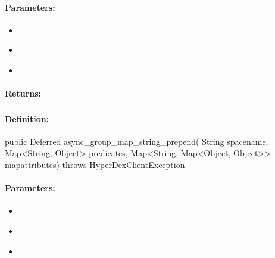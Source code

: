 \paragraph{Parameters:}
\begin{itemize}[noitemsep]
\item {}\\

\item {}\\

\item {}\\

\end{itemize}

\paragraph{Returns:}


\pagebreak
\subsubsection{}
\label{api:java:async_group_map_string_prepend}


\paragraph{Definition:}
\begin{javacode}
public Deferred async_group_map_string_prepend(
        String spacename,
        Map<String, Object> predicates,
        Map<String, Map<Object, Object>> mapattributes) throws HyperDexClientException
\end{javacode}

\paragraph{Parameters:}
\begin{itemize}[noitemsep]
\item {}\\

\item {}\\

\item {}\\

\end{itemize}

